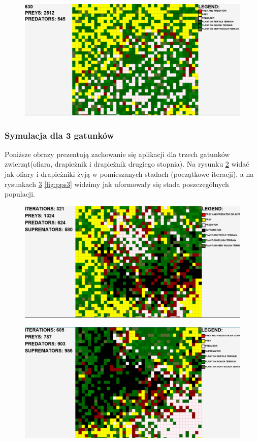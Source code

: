 \begin{figure}[!htb]
	\centering
	\includegraphics[width=1.1\linewidth]{img/tii2}
	\caption{\label{fig:pp2} }
\end{figure}

\subsubsection{Symulacja dla 3 gatunków}
Poniższe obrazy prezentują zachowanie się aplikacji dla trzech gatunków zwierząt(ofiara, drapieżnik i drapieżnik drugiego stopnia). Na rysunku \ref{fig:pps1} widać jak ofiary i drapieżniki żyją w pomieszanych stadach (początkowe iteracji), a na rysunkach \ref{fig:pps2} \ref{fig:pps3} widzimy jak uformowały się stada poszczególnych populacji.
\begin{figure}[!htb]
	\centering
	\includegraphics[width=1.1\linewidth]{img/dare}
	\caption{\label{fig:pps1} }
\end{figure}

\begin{figure}[!htb]
	\centering
	\includegraphics[width=1.1\linewidth]{img/dare2}
	\caption{\label{fig:pps2} }
\end{figure}

